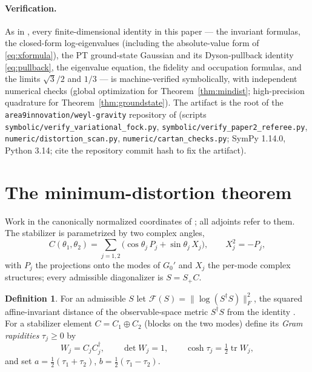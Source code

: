 \documentclass[11pt]{article}
\theoremstyle{definition}
\newtheorem{definition}[theorem]{Definition}
\theoremstyle{remark}
\newcommand{\tr}{\operatorname{tr}}
\newcommand{\dg}{\dagger}
\begin{document}
\paragraph{Verification.}
As in \cite{companion}, every finite-dimensional identity in this paper ---
the invariant formulas, the closed-form log-eigenvalues (including the
absolute-value form of \eqref{eq:xformula}), the PT ground-state
Gaussian and its Dyson-pullback identity \eqref{eq:pullback}, the
eigenvalue equation, the fidelity and occupation formulas, and
the limits $\sqrt3/2$ and $1/3$ --- is machine-verified symbolically, with
independent numerical checks (global optimization for
Theorem~\ref{thm:mindist}; high-precision quadrature for
Theorem~\ref{thm:groundstate}).  The artifact is the root of the
\texttt{area9innovation/weyl-gravity} repository of \cite{companion}
(scripts \texttt{symbolic/verify\_variational\_fock.py},
\texttt{symbolic/verify\_paper2\_referee.py},
\texttt{numeric/distortion\_scan.py}, \texttt{numeric/cartan\_checks.py};
SymPy 1.14.0, Python 3.14; cite the repository commit hash to fix the
artifact).

\section{The minimum-distortion theorem}\label{sec:mindist}

Work in the canonically normalized coordinates of \cite{companion}; all
adjoints refer to them.  The stabilizer is parametrized by two complex
angles,
\begin{equation}
C(\theta_1,\theta_2)=\sum_{j=1,2}\big(\cos\theta_j\,P_j+\sin\theta_j\,X_j\big),
\qquad X_j^2=-P_j ,
\end{equation}
with $P_j$ the projections onto the modes of $G_0'$ and $X_j$ the per-mode
complex structures; every admissible diagonalizer is $S=S_+C$.

\begin{definition}
For an admissible $S$ let
$\mathcal F(S)=\|\log(S^{\dg}S)\|_F^2$, the squared affine-invariant distance
of the observable-space metric $S^{\dg}S$ from the identity
\cite{Bhatia2007}.  For a stabilizer element $C=C_1\oplus C_2$ (blocks on the
two modes) define its \emph{Gram rapidities} $\tau_j\ge0$ by
\begin{equation}
W_j=C_jC_j^{\dg},\qquad \det W_j=1,\qquad
\cosh\tau_j=\tfrac12\tr W_j ,
\end{equation}
and set $a=\tfrac12(\tau_1+\tau_2)$, $b=\tfrac12(\tau_1-\tau_2)$.
\end{definition}
\end{document}
